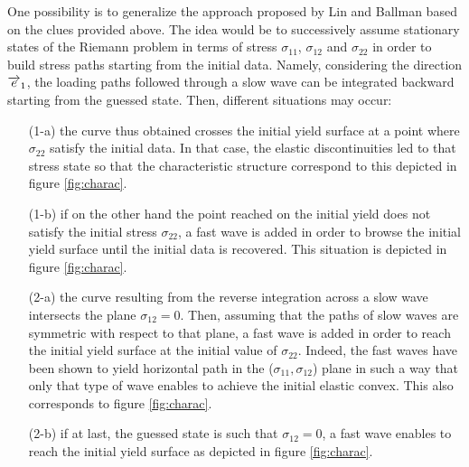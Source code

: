 One possibility is to generalize the approach proposed by Lin and Ballman \cite{Lin_et_Ballman} based on the clues provided above.
The idea would be to successively assume stationary states of the Riemann problem in terms of stress $\sigma_{11}$, $\sigma_{12}$ and $\sigma_{22}$ in order to build stress paths starting from the initial data.
Namely, considering the direction ${\overrightarrow{e}}_1$, the loading paths followed through a slow wave can be integrated backward starting from the guessed state.
Then, different situations may occur:
\begin{itemize}
\item[(1-a)] the curve thus obtained crosses the initial yield surface at a point where $\sigma_{22}$ satisfy the initial data.
  In that case, the elastic discontinuities led to that stress state so that the characteristic structure correspond to this depicted in figure \ref{fig:charac}.
\item[(1-b)] if on the other hand the point reached on the initial yield does not satisfy the initial stress $\sigma_{22}$, a fast wave is added in order to browse the initial yield surface until the initial data is recovered.
  This situation is depicted in figure \ref{fig:charac}.
\item[(2-a)] the curve resulting from the reverse integration across a slow wave intersects the plane $\sigma_{12}=0$.
  Then, assuming that the paths of slow waves are symmetric with respect to that plane, a fast wave is added in order to reach the initial yield surface at the initial value of $\sigma_{22}$.
  Indeed, the fast waves have been shown to yield horizontal path in the ($\sigma_{11},\sigma_{12}$) plane in such a way that only that type of wave enables to achieve the initial elastic convex.
  This also corresponds to figure \ref{fig:charac}.
\item[(2-b)] if at last, the guessed state is such that $\sigma_{12}=0$, a fast wave enables to reach the initial yield surface as depicted in figure \ref{fig:charac}.
\end{itemize}

